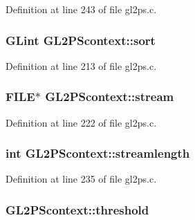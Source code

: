 Definition at line 243 of file gl2ps.\+c.

\hypertarget{struct_g_l2_p_scontext_a138a8c9e7e3692853b32be020346ef14}{}
\subsubsection[{sort}]{\setlength{\rightskip}{0pt plus 5cm}G\+Lint G\+L2\+P\+Scontext\+::sort}\label{struct_g_l2_p_scontext_a138a8c9e7e3692853b32be020346ef14}


Definition at line 213 of file gl2ps.\+c.

\hypertarget{struct_g_l2_p_scontext_ad069183e2781d7d095a94d935ea333bc}{}
\subsubsection[{stream}]{\setlength{\rightskip}{0pt plus 5cm}F\+I\+L\+E$\ast$ G\+L2\+P\+Scontext\+::stream}\label{struct_g_l2_p_scontext_ad069183e2781d7d095a94d935ea333bc}


Definition at line 222 of file gl2ps.\+c.

\hypertarget{struct_g_l2_p_scontext_ac18da171d9e16e62f816c3b7370ce060}{}
\subsubsection[{streamlength}]{\setlength{\rightskip}{0pt plus 5cm}int G\+L2\+P\+Scontext\+::streamlength}\label{struct_g_l2_p_scontext_ac18da171d9e16e62f816c3b7370ce060}


Definition at line 235 of file gl2ps.\+c.

\hypertarget{struct_g_l2_p_scontext_a54fd6f5a72a26b3f578f3526250984e2}{}
\subsubsection[{threshold}]{ G\+L2\+P\+Scontext\+::threshold}\label{struct_g_l2_p_scontext_a54fd6f5a72a26b3f578f3526250984e2}


